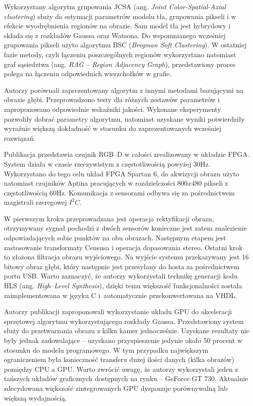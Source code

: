 \documentclass[b5paper,10pt,twoside]{article}
\begin{document}
{Wykorzystany algorytm grupowania JCSA (ang. \textit{Joint Color-Spatial-Axial clustering}) służy do estymacji parametrów modelu tła, grupowania pikseli i w efekcie wyodrębnienia regionów na obrazie. 
Sam model tła jest hybrydowy i składa się z rozkładów Gaussa oraz Watsona. 
Do wspomnianego wcześniej grupowania pikseli użyto algorytmu BSC (\textit{Bregman Soft Clustering}). 
W ostatniej fazie metody, czyli łączeniu poszczególnych regionów wykorzystano natomiast graf sąsiedztwa (ang. \textit{RAG -- Region Adjacency Graph}), przedstawiony proces polega na łączeniu odpowiednich wierzchołków w grafie.

Autorzy porównali zaprezentowany algorytm z innymi metodami bazującymi na obrazie głębi. 
Przeprowadzono testy dla różnych zestawów parametrów i zaproponowano odpowiednie wskaźniki jakości. 
Wykonane eksperymenty pozwoliły dobrać parametry algorytmu, natomiast uzyskane wyniki potwierdziły wyraźnie większą dokładność w stosunku do zaprezentowanych wcześniej rozwiązań.

Publikacja \cite{Mattoccia_2015} przedstawia czujnik RGB--D w całości zrealizowany w układzie FPGA. 
System działa w czasie rzeczywistym z częstotliwością powyżej $30$Hz. 
Wykorzystano do tego celu układ FPGA Spartan 6, do akwizycji obrazu użyto natomiast czujników Aptina pracujących w rozdzielczości $800x480$ pikseli z częstotliwością $60$Hz. 
Komunikacja z sensorami odbywa się za pośrednictwem magistrali szeregowej $I^2C$.

W pierwszym kroku przeprowadzana jest operacja rektyfikacji obrazu, otrzymywany sygnał pochodzi z dwóch sensorów konieczne jest zatem znalezienie odpowiadających sobie punktów na obu obrazach. Następnym etapem jest zastosowanie transformaty Censusa i operacja dopasowania stereo. Ostatni krok to złożona filtracja obrazu wyjściowego. Na wyjście systemu przekazywany jest 16 bitowy obraz głębi, który następnie jest przesyłany do hosta za pośrednictwem portu USB. Warto zaznaczyć, że autorzy wykorzystali technikę generacji kodu HLS (ang. \textit{High--Level Synthesis}), dzięki temu większość funkcjonalności została zaimplementowana w języku C i~automatycznie przekonwertowana na VHDL.



Autorzy publikacji \cite{Boghdady_2015} zaproponowali wykorzystanie układu GPU do akceleracji sprzętowej algorytmu wykorzystującego rozkłady Gaussa. 
Przedstawiony system służy do przetwarzania obrazu z kilku kamer jednocześnie. 
Uzyskane rezultaty nie były jednak zadowalające -- uzyskano przyspieszenie jedynie około 50 procent w stosunku do modelu programowego. %
W tym przypadku największym ograniczeniem była konieczność transferu dużej ilości danych (kilka obrazów) pomiędzy CPU a GPU. 
Warto zwrócić uwagę, że autorzy wykorzystali jeden z tańszych układów graficznych dostępnych na rynku -- GeForce GT 730. 
Aktualnie zdecydowana większość zintegrowanych GPU dysponuje porównywalną lub większą wydajnością. 

}
\end{document}
